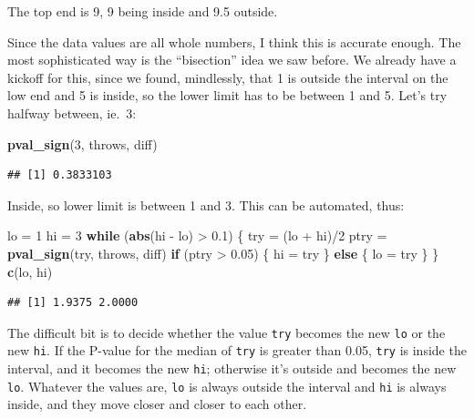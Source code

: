 \documentclass[]{tufte-book}
\newenvironment{Shaded}{}{}
\newcommand{\ControlFlowTok}[1]{\textcolor[rgb]{0.00,0.44,0.13}{\textbf{#1}}}
\newcommand{\DecValTok}[1]{\textcolor[rgb]{0.25,0.63,0.44}{#1}}
\newcommand{\FloatTok}[1]{\textcolor[rgb]{0.25,0.63,0.44}{#1}}
\newcommand{\KeywordTok}[1]{\textcolor[rgb]{0.00,0.44,0.13}{\textbf{#1}}}
\newcommand{\NormalTok}[1]{#1}
\newcommand{\OperatorTok}[1]{\textcolor[rgb]{0.40,0.40,0.40}{#1}}
\newcommand{\StringTok}[1]{\textcolor[rgb]{0.25,0.44,0.63}{#1}}
\theoremstyle{definition}
\theoremstyle{definition}
\theoremstyle{definition}
\theoremstyle{remark}
\begin{document}
The top end is 9, 9 being inside and 9.5 outside.

Since the data values are all whole numbers, I think this is accurate
enough. The most sophisticated way is the ``bisection'' idea we saw
before. We already have a kickoff for this, since we found, mindlessly,
that 1 is outside the interval on the low end and 5 is inside, so the
lower limit has to be between 1 and 5. Let's try halfway between, ie.~3:

\begin{Shaded}
\begin{Highlighting}[]
\KeywordTok{pval_sign}\NormalTok{(}\DecValTok{3}\NormalTok{, throws, diff)}
\end{Highlighting}
\end{Shaded}

\begin{verbatim}
## [1] 0.3833103
\end{verbatim}

Inside, so lower limit is between 1 and 3. This can be automated, thus:

\begin{Shaded}
\begin{Highlighting}[]
\NormalTok{lo =}\StringTok{ }\DecValTok{1}
\NormalTok{hi =}\StringTok{ }\DecValTok{3}
\ControlFlowTok{while}\NormalTok{ (}\KeywordTok{abs}\NormalTok{(hi }\OperatorTok{-}\StringTok{ }\NormalTok{lo) }\OperatorTok{>}\StringTok{ }\FloatTok{0.1}\NormalTok{) \{}
\NormalTok{    try =}\StringTok{ }\NormalTok{(lo }\OperatorTok{+}\StringTok{ }\NormalTok{hi)}\OperatorTok{/}\DecValTok{2}
\NormalTok{    ptry =}\StringTok{ }\KeywordTok{pval_sign}\NormalTok{(try, throws, diff)}
    \ControlFlowTok{if}\NormalTok{ (ptry }\OperatorTok{>}\StringTok{ }\FloatTok{0.05}\NormalTok{) \{}
\NormalTok{        hi =}\StringTok{ }\NormalTok{try}
\NormalTok{    \} }\ControlFlowTok{else}\NormalTok{ \{}
\NormalTok{        lo =}\StringTok{ }\NormalTok{try}
\NormalTok{    \}}
\NormalTok{\}}
\KeywordTok{c}\NormalTok{(lo, hi)}
\end{Highlighting}
\end{Shaded}

\begin{verbatim}
## [1] 1.9375 2.0000
\end{verbatim}

The difficult bit is to decide whether the value \texttt{try} becomes
the new \texttt{lo} or the new \texttt{hi}. If the P-value for the
median of \texttt{try} is greater than 0.05, \texttt{try} is inside the
interval, and it becomes the new \texttt{hi}; otherwise it's outside and
becomes the new \texttt{lo}. Whatever the values are, \texttt{lo} is
always outside the interval and \texttt{hi} is always inside, and they
move closer and closer to each other.
\end{document}
